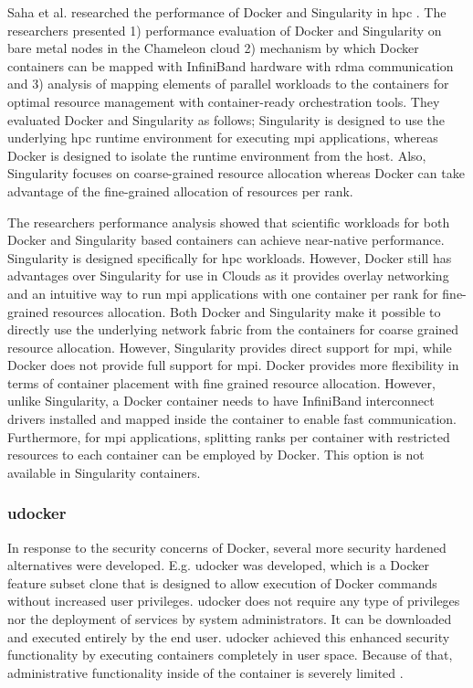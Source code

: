 \documentclass[conference]{IEEEtran}
\begin{document}
Saha et al. researched the performance of Docker and Singularity in \gls{hpc} \cite{saha2018evaluation}. The researchers presented 1) performance evaluation of Docker and Singularity on bare metal nodes in the Chameleon cloud 2) mechanism by which Docker containers can be mapped with InfiniBand hardware with \gls{rdma} communication and 3) analysis of mapping elements of parallel workloads to the containers for optimal resource management with container-ready orchestration tools. They evaluated Docker and Singularity as follows; Singularity is designed to use the underlying \gls{hpc} runtime environment for executing \gls{mpi} applications, whereas Docker is designed to isolate the runtime environment from the host. Also, Singularity focuses on coarse-grained resource allocation whereas Docker can take advantage of the fine-grained allocation of resources per rank.

The researchers performance analysis showed that scientific workloads for both Docker and Singularity based containers can achieve near-native performance. Singularity is designed specifically for \gls{hpc} workloads. However, Docker still has advantages over Singularity for use in Clouds as it provides overlay networking and an intuitive way to run \gls{mpi} applications with one container per rank for fine-grained resources allocation. Both Docker and Singularity make it possible to directly use the underlying network fabric from the containers for coarse grained resource allocation. However, Singularity provides direct support for \gls{mpi}, while Docker does not provide full support for \gls{mpi}. Docker provides more flexibility in terms of container placement with fine grained resource allocation. However, unlike Singularity, a Docker container needs to have InfiniBand interconnect drivers installed and mapped inside the container to enable fast communication. Furthermore, for \gls{mpi} applications, splitting ranks per container with restricted resources to each container can be employed by Docker. This option is not available in Singularity containers.


\subsubsection{udocker}
In response to the security concerns of Docker, several more security hardened alternatives were developed. E.g. udocker was developed, which is a Docker feature subset clone that is designed to allow execution of Docker commands without increased user privileges. udocker does not require any type of privileges nor the deployment of services by system administrators. It can be downloaded and executed entirely by the end user. udocker achieved this enhanced security functionality by executing containers completely in user space. Because of that, administrative functionality inside of the container is severely limited \cite{utah-udocker}.
\end{document}
